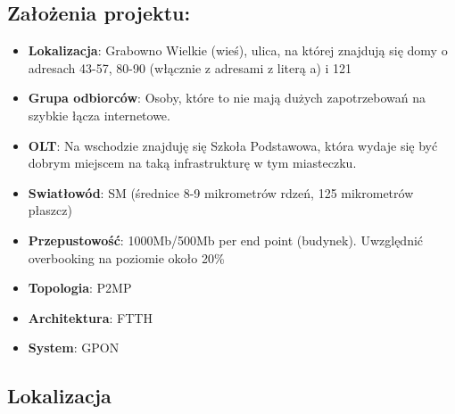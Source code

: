 \subsection{Założenia projektu:}
\begin{itemize}
	\item \textbf{Lokalizacja}: Grabowno Wielkie (wieś), ulica, na której znajdują się domy o adresach 43-57, 80-90 (włącznie z adresami z literą a) i 121
	\item \textbf{Grupa odbiorców}: Osoby, które to nie mają dużych zapotrzebowań na szybkie łącza internetowe.
	\item \textbf{OLT}: Na wschodzie znajduję się Szkoła Podstawowa, która wydaje się być dobrym miejscem na taką infrastrukturę w tym miasteczku.
	\item \textbf{Swiatłowód}: SM (średnice 8-9 mikrometrów rdzeń, 125 mikrometrów płaszcz)
	\item \textbf{Przepustowość}: 1000Mb/500Mb per end point (budynek). Uwzględnić overbooking na poziomie około 20\%
	\item \textbf{Topologia}: P2MP
	\item \textbf{Architektura}: FTTH
	\item \textbf{System}: GPON
\end{itemize}

\newpage
\subsection{Lokalizacja}

